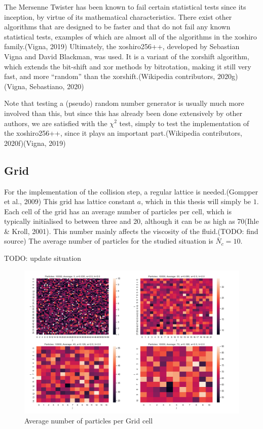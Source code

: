 \documentclass[
]{article}
\begin{document}
The Mersenne Twister has been known to fail certain statistical tests
since its inception, by virtue of its mathematical characteristics.
There exist other algorithms that are designed to be faster and that do
not fail any known statistical tests, examples of which are almost all
of the algorithms in the xoshiro family.(Vigna, 2019) Ultimately, the
xoshiro256++, developed by Sebastian Vigna and David Blackman, was used.
It is a variant of the xorshift algorithm, which extends the bit-shift
and xor methods by bitrotation, making it still very fast, and more
``random'' than the xorshift.(Wikipedia contributors, 2020g)(Vigna,
Sebastiano, 2020)

Note that testing a (pseudo) random number generator is usually much
more involved than this, but since this has already been done
extensively by other authors, we are satisfied with the \(\chi^2\) test,
simply to test the implementation of the xoshiro256++, since it plays an
important part.(Wikipedia contributors, 2020f)(Vigna, 2019)

\hypertarget{grid}{%
\subsection{Grid}\label{grid}}

For the implementation of the collision step, a regular lattice is
needed.(Gompper et al., 2009) This grid has lattice constant \(a\),
which in this thesis will simply be \(1\). Each cell of the grid has an
average number of particles per cell, which is typically initialised to
between three and 20, although it can be as high as 70(Ihle \& Kroll,
2001). This number mainly affects the viscosity of the fluid.(TODO: find
source) The average number of particles for the studied situation is
\(\bar N_c = 10\).

TODO: update situation

\begin{figure}
\centering
\includegraphics{Assets/average_grid_particles.png}
\caption{Average number of particles per Grid cell}
\end{figure}
\end{document}
